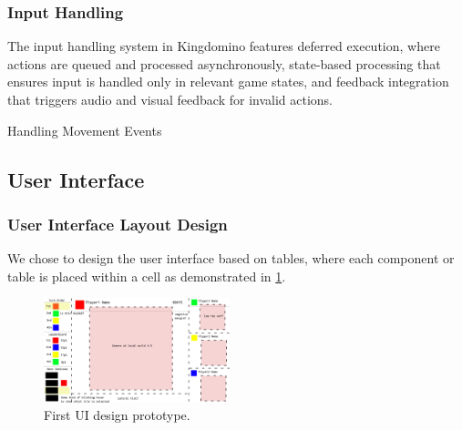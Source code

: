 \documentclass[conference]{IEEEtran}
\begin{document}
\subsubsection{Input Handling}
The input handling system in Kingdomino features deferred execution, where actions are queued and processed asynchronously, state-based processing that ensures input is handled only in relevant game states, and feedback integration that triggers audio and visual feedback for invalid actions.
\begin{algorithm}[htbp]
    \caption{Handling Movement Events}
\end{algorithm}

\subsection{User Interface}

\subsubsection{User Interface Layout Design}

We chose to design the user interface based on tables, where each component or
table is placed within a cell as demonstrated in \ref{fig:ui-proto}.

\begin{figure}[htbp]
    \centerline{\includegraphics[width=0.48\textwidth]{assets/ui-prototype.png}}
    \caption{First UI design prototype.}\label{fig:ui-proto}
\end{figure}
\end{document}
